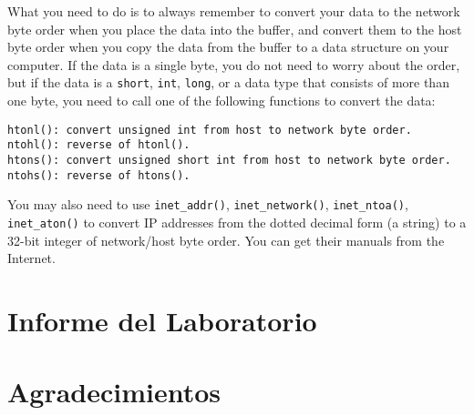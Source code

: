 What you need to do is to always remember to convert your data to the
network byte order when you place the data into the buffer, and convert
them to the host byte order when you copy the data from the buffer to 
a data structure on your computer. If the data is a single byte, you do not
need to worry about the order, but if the data is a {\tt short}, 
{\tt int}, {\tt long}, or a data type that consists of more than one byte, 
you need to call one of the following functions to convert the data:

\begin{lstlisting}
htonl(): convert unsigned int from host to network byte order.
ntohl(): reverse of htonl().
htons(): convert unsigned short int from host to network byte order.
ntohs(): reverse of htons().
\end{lstlisting}


You may also need to use {\tt inet\_addr()}, {\tt inet\_network()},
{\tt inet\_ntoa()}, {\tt inet\_aton()} to convert 
IP addresses from the dotted decimal form (a string) to a
32-bit integer of network/host byte order. You can get their 
manuals from the Internet.


 

\section{Informe del Laboratorio}



\section{Agradecimientos}








